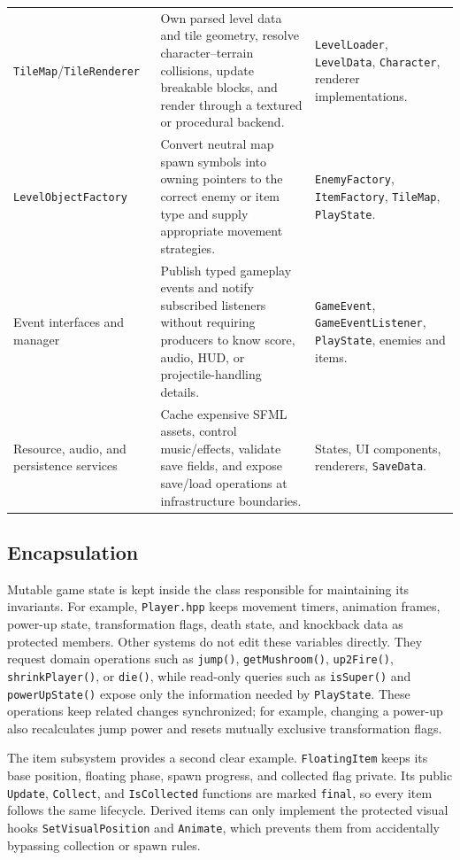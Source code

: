 \documentclass{template}
\begin{document}
{\begin{longtable}{@{}>{\raggedright\arraybackslash}p{4.10cm}
                        >{\raggedright\arraybackslash}p{5.80cm}
                        >{\raggedright\arraybackslash}p{4.65cm}@{}}
    \texttt{TileMap}/\allowbreak\texttt{TileRenderer} & Own parsed level data and tile
    geometry, resolve character--terrain collisions, update breakable blocks,
    and render through a textured or procedural backend. & \texttt{LevelLoader},
    \texttt{LevelData}, \texttt{Character}, renderer implementations. \\
    \texttt{LevelObjectFactory} & Convert neutral map spawn symbols into
    owning pointers to the correct enemy or item type and supply appropriate
    movement strategies. & \texttt{EnemyFactory}, \texttt{ItemFactory},
    \texttt{TileMap}, \texttt{PlayState}. \\
    Event interfaces and manager & Publish typed gameplay events and notify
    subscribed listeners without requiring producers to know score, audio, HUD,
    or projectile-handling details. & \texttt{GameEvent},
    \texttt{GameEventListener}, \texttt{PlayState}, enemies and items. \\
    Resource, audio, and persistence services & Cache expensive SFML assets,
    control music/effects, validate save fields, and expose save/load operations
    at infrastructure boundaries. & States, UI components, renderers,
    \texttt{SaveData}. \\
    \bottomrule
\end{longtable}
}

\subsection{Encapsulation}

Mutable game state is kept inside the class responsible for maintaining its
invariants. For example, \texttt{Player.hpp} keeps movement timers, animation
frames, power-up state, transformation flags, death state, and knockback data
as protected members. Other systems do not edit these variables directly.
They request domain operations such as \texttt{jump()},
\texttt{getMushroom()}, \texttt{up2Fire()}, \texttt{shrinkPlayer()}, or
\texttt{die()}, while read-only queries such as \texttt{isSuper()} and
\texttt{powerUpState()} expose only the information needed by
\texttt{PlayState}. These operations keep related changes synchronized; for
example, changing a power-up also recalculates jump power and resets mutually
exclusive transformation flags.

The item subsystem provides a second clear example. \texttt{FloatingItem}
keeps its base position, floating phase, spawn progress, and collected flag
private. Its public \texttt{Update}, \texttt{Collect}, and
\texttt{IsCollected} functions are marked \texttt{final}, so every item follows
the same lifecycle. Derived items can only implement the protected visual hooks
\texttt{SetVisualPosition} and \texttt{Animate}, which prevents them from
accidentally bypassing collection or spawn rules.
\end{document}
